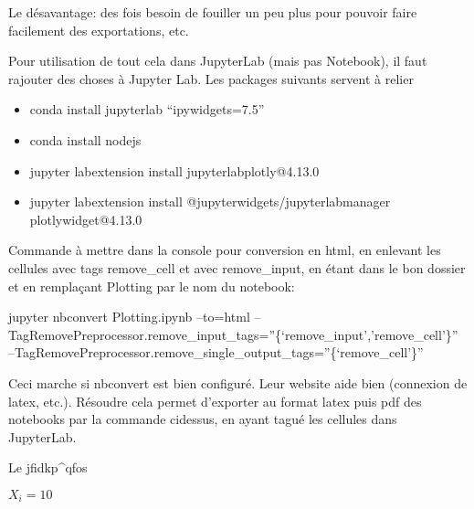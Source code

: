 \documentclass[letterpaper,10pt,english]{sphinxmanual}
\begin{document}
Le désavantage: des fois besoin de fouiller un peu plus pour pouvoir faire facilement des exportations, etc.

Pour utilisation de tout cela dans JupyterLab (mais pas Notebook), il faut rajouter des choses à Jupyter Lab.
Les packages suivants servent à relier
\begin{itemize}
\item {} 
conda install jupyterlab “ipywidgets=7.5”

\item {} 
conda install nodejs

\item {} 
jupyter labextension install jupyterlab\sphinxhyphen{}plotly@4.13.0

\item {} 
jupyter labextension install @jupyter\sphinxhyphen{}widgets/jupyterlab\sphinxhyphen{}manager plotlywidget@4.13.0

\end{itemize}

Commande à mettre dans la console pour conversion en html, en enlevant les cellules avec tags remove\_cell et avec remove\_input, en étant dans le bon dossier et en remplaçant Plotting par le nom du notebook:

jupyter nbconvert Plotting.ipynb –to=html –TagRemovePreprocessor.remove\_input\_tags=”\{‘remove\_input’,’remove\_cell’\}” –TagRemovePreprocessor.remove\_single\_output\_tags=”\{‘remove\_cell’\}”

Ceci marche si nbconvert est bien configuré. Leur website aide bien (connexion de latex, etc.). Résoudre cela permet d’exporter au format latex puis pdf des notebooks par la commande ci\sphinxhyphen{}dessus, en ayant tagué les cellules dans JupyterLab.

Le jfidkp\textasciicircum{}qfos

\(X_i=10\)

\begin{sphinxVerbatim}[commandchars=\\\{\}]
   
   
       
   
   
    
   
\end{sphinxVerbatim}
\end{document}
